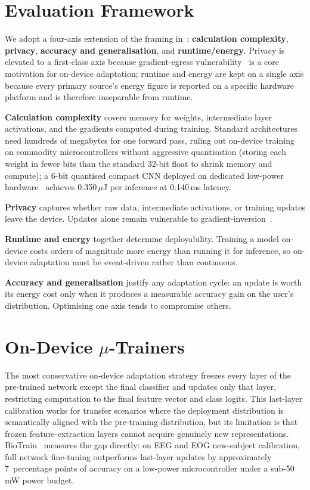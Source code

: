 \documentclass[conference]{IEEEtran}
\newcommand{\mut}{\texorpdfstring{$\mu$}{\textmu}}
\begin{document}
\section{Evaluation Framework}
\label{sec:framework}

We adopt a four-axis extension of the framing in~\cite{b1}:
\textbf{calculation complexity}, \textbf{privacy}, \textbf{accuracy
and generalisation}, and \textbf{runtime/energy}. Privacy is
elevated to a first-class axis because gradient-egress
vulnerability~\cite{b8} is a core motivation for on-device
adaptation; runtime and energy are kept on a single axis because
every primary source's energy figure is reported on a specific
hardware platform and is therefore inseparable from runtime.

\textbf{Calculation complexity} covers memory for weights,
intermediate layer activations, and the gradients computed during
training. Standard architectures need hundreds of megabytes for one
forward pass, ruling out on-device training on commodity
microcontrollers without aggressive quantisation (storing each
weight in fewer bits than the standard 32-bit float to shrink
memory and compute); a 6-bit quantised compact CNN deployed on
dedicated low-power hardware~\cite{b10} achieves 0.350\,$\mu$J per
inference at 0.140\,ms latency.

\textbf{Privacy} captures whether raw data, intermediate
activations, or training updates leave the device. Updates alone
remain vulnerable to gradient-inversion~\cite{b8,Geiping}.

\textbf{Runtime and energy} together determine deployability.
Training a model on-device costs orders of magnitude more energy
than running it for inference, so on-device adaptation must be
event-driven rather than continuous.

\textbf{Accuracy and generalisation} justify any adaptation cycle:
an update is worth its energy cost only when it produces a
measurable accuracy gain on the user's distribution. Optimising
one axis tends to compromise others.

\section{On-Device \mut-Trainers}
\label{sec:mutrainers}

The most conservative on-device adaptation strategy freezes every
layer of the pre-trained network except the final classifier and
updates only that layer, restricting computation to the final
feature vector and class logits. This last-layer calibration works
for transfer scenarios where the deployment distribution is
semantically aligned with the pre-training distribution, but its
limitation is that frozen feature-extraction layers cannot acquire
genuinely new representations. BioTrain~\cite{BioTrain}
measures the gap directly: on EEG and EOG new-subject calibration,
full network fine-tuning outperforms last-layer updates by
approximately 7~percentage points of accuracy on a low-power
microcontroller under a sub-50\,mW power budget.
\end{document}
